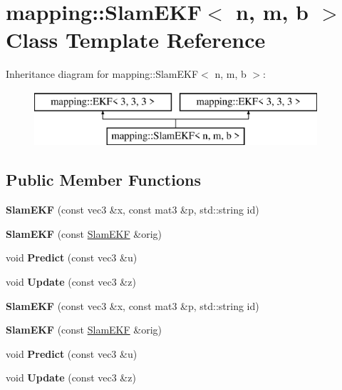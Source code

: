\hypertarget{classmapping_1_1SlamEKF}{}\section{mapping\+:\+:Slam\+E\+KF$<$ n, m, b $>$ Class Template Reference}
\label{classmapping_1_1SlamEKF}
Inheritance diagram for mapping\+:\+:Slam\+E\+KF$<$ n, m, b $>$\+:\begin{figure}[H]
\begin{center}
\leavevmode
\includegraphics[height=2.000000cm]{classmapping_1_1SlamEKF}
\end{center}
\end{figure}
\subsection*{Public Member Functions}
\begin{DoxyCompactItemize}
\item 
\mbox{\label{classmapping_1_1SlamEKF_aad51dcf4c1b3da0e0121dc17a03b88ed}} 
{\bfseries Slam\+E\+KF} (const vec3 \&x, const mat3 \&p, std\+::string id)
\item 
\mbox{\label{classmapping_1_1SlamEKF_a4eebb12b60447d976746e02211f2b918}} 
{\bfseries Slam\+E\+KF} (const \hyperlink{classmapping_1_1SlamEKF}{Slam\+E\+KF} \&orig)
\item 
\mbox{\label{classmapping_1_1SlamEKF_a3d7de03842a32705e81351b614d119f3}} 
void {\bfseries Predict} (const vec3 \&u)
\item 
\mbox{\label{classmapping_1_1SlamEKF_a6aa3d9e6ca1ccc4cabb2b0e2a02518ac}} 
void {\bfseries Update} (const vec3 \&z)
\item 
\mbox{\label{classmapping_1_1SlamEKF_aad51dcf4c1b3da0e0121dc17a03b88ed}} 
{\bfseries Slam\+E\+KF} (const vec3 \&x, const mat3 \&p, std\+::string id)
\item 
\mbox{\label{classmapping_1_1SlamEKF_a4eebb12b60447d976746e02211f2b918}} 
{\bfseries Slam\+E\+KF} (const \hyperlink{classmapping_1_1SlamEKF}{Slam\+E\+KF} \&orig)
\item 
\mbox{\label{classmapping_1_1SlamEKF_a3d7de03842a32705e81351b614d119f3}} 
void {\bfseries Predict} (const vec3 \&u)
\item 
\mbox{\label{classmapping_1_1SlamEKF_a6aa3d9e6ca1ccc4cabb2b0e2a02518ac}} 
void {\bfseries Update} (const vec3 \&z)
\end{DoxyCompactItemize}

